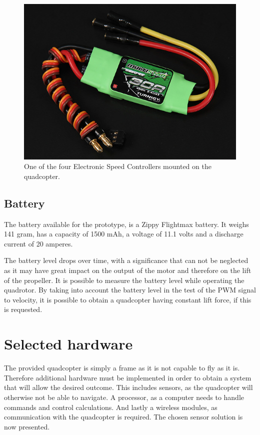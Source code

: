 \begin{figure}[H]
	\centering
	\includegraphics[scale=0.4]{figures/ESC}
	\caption{One of the four Electronic Speed Controllers mounted on the quadcopter.\cite{HKing}}
	\label{fig:esc}
\end{figure}

\subsection{Battery}
The battery available for the prototype, is a Zippy Flightmax battery. It weighs 141 gram, has a capacity of 1500 mAh, a voltage of 11.1 volts and a discharge current of 20 amperes.

The battery level drops over time, with a significance that can not be neglected as it may have great impact on the output of the motor and therefore on the lift of the propeller. It is possible to measure the battery level while operating the quadrotor. By taking into account the battery level in the test of the PWM signal to velocity, it is possible to obtain a quadcopter having constant lift force, if this is requested.

\section{Selected hardware}
The provided quadcopter is simply a frame as it is not capable to fly as it is. Therefore additional hardware must be implemented in order to obtain a system that will allow the desired outcome. This includes sensors, as the quadcopter will otherwise not be able to navigate. A processor, as a computer needs to handle commands and control calculations. And lastly a wireless modules, as communication with the quadcopter is required. The chosen sensor solution is now presented.
